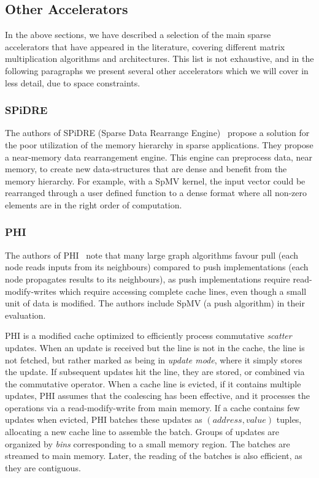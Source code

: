 

\subsection{Other Accelerators}
\label{sec:soa:other_accel}

In the above sections, we have described a selection of the main sparse accelerators that have appeared in the literature, covering different matrix multiplication algorithms and architectures. This list is not exhaustive, and in the following paragraphs we present several other accelerators which we will cover in less detail, due to space constraints.

\subsubsection{SPiDRE}

The authors of SPiDRE (Sparse Data Rearrange Engine)~\cite{Barredo2019_SPiDRE} propose a solution for the poor utilization of the memory hierarchy in sparse applications. They propose a near-memory data rearrangement engine. This engine can preprocess data, near memory, to create new data-structures that are dense and benefit from the memory hierarchy. For example, with a SpMV kernel, the input vector could be rearranged through a user defined function to a dense format where all non-zero elements are in the right order of computation.

\subsubsection{PHI}

The authors of PHI~\cite{Mukkara2019_PHI} note that many large graph algorithms favour pull (each node reads inputs from its neighbours) compared to push implementations (each node propagates results to its neighbours), as push implementations require read-modify-writes which require accessing complete cache lines, even though a small unit of data is modified. The authors include  SpMV (a push algorithm) in their evaluation.

PHI is a modified cache optimized to efficiently process commutative \emph{scatter} updates. When an update is received but the line is not in the cache, the line is not fetched, but rather marked as being in \emph{update mode}, where it simply stores the update. If subsequent updates hit the line, they are stored, or combined via the commutative operator. When a cache line is evicted, if it contains multiple updates, PHI assumes that the coalescing has been effective, and it processes the operations via a read-modify-write from main memory. If a cache contains few updates when evicted, PHI batches these updates as $(address, value)$ tuples, allocating a new cache line to assemble the batch. Groups of updates are organized by \emph{bins} corresponding to a small memory region. The batches are streamed to main memory. Later, the reading of the batches is also efficient, as they are contiguous.

